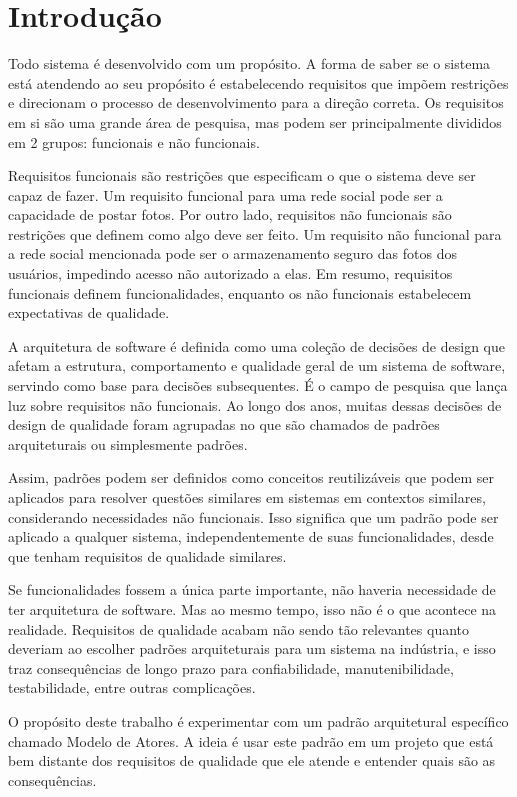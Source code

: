 \chapter{Introdução}

Todo sistema é desenvolvido com um propósito. A forma de saber se o sistema está atendendo ao seu propósito é estabelecendo requisitos que impõem restrições e direcionam o processo de desenvolvimento para a direção correta. Os requisitos em si são uma grande área de pesquisa, mas podem ser principalmente divididos em 2 grupos: funcionais e não funcionais.

Requisitos funcionais são restrições que especificam o que o sistema deve ser capaz de fazer. Um requisito funcional para uma rede social pode ser a capacidade de postar fotos. Por outro lado, requisitos não funcionais são restrições que definem como algo deve ser feito. Um requisito não funcional para a rede social mencionada pode ser o armazenamento seguro das fotos dos usuários, impedindo acesso não autorizado a elas. Em resumo, requisitos funcionais definem funcionalidades, enquanto os não funcionais estabelecem expectativas de qualidade.

A arquitetura de software é definida como uma coleção de decisões de design que afetam a estrutura, comportamento e qualidade geral de um sistema de software, servindo como base para decisões subsequentes. É o campo de pesquisa que lança luz sobre requisitos não funcionais. Ao longo dos anos, muitas dessas decisões de design de qualidade foram agrupadas no que são chamados de padrões arquiteturais ou simplesmente padrões.

Assim, padrões podem ser definidos como conceitos reutilizáveis que podem ser aplicados para resolver questões similares em sistemas em contextos similares, considerando necessidades não funcionais. Isso significa que um padrão pode ser aplicado a qualquer sistema, independentemente de suas funcionalidades, desde que tenham requisitos de qualidade similares.

Se funcionalidades fossem a única parte importante, não haveria necessidade de ter arquitetura de software. Mas ao mesmo tempo, isso não é o que acontece na realidade. Requisitos de qualidade acabam não sendo tão relevantes quanto deveriam ao escolher padrões arquiteturais para um sistema na indústria, e isso traz consequências de longo prazo para confiabilidade, manutenibilidade, testabilidade, entre outras complicações.

O propósito deste trabalho é experimentar com um padrão arquitetural específico chamado Modelo de Atores. A ideia é usar este padrão em um projeto que está bem distante dos requisitos de qualidade que ele atende e entender quais são as consequências.

